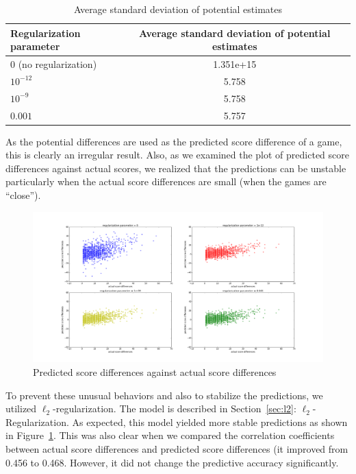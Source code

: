 \documentclass{article} %
\begin{document}
\begin{table}
\begin{center}
  \begin{tabular}{ | l | c | r | }
    \hline
    Regularization parameter & Average standard deviation of potential estimates \\ \hline
    0 (no regularization) & 1.351e+15 \\ \hline
    $10^{-12}$ & 5.758\\ \hline
    $10^{-9}$ & 5.758\\ \hline
    $0.001$ & 5.757\\
    \hline
  \end{tabular}
  \caption{Average standard deviation of potential estimates}
  \label{table:std}
\end{center}
\end{table}

As the potential differences are used as the predicted score difference of a game, this is clearly an irregular result.  Also, as we examined the plot of predicted score differences against actual scores, we realized that the predictions can be unstable particularly when the actual score differences are small (when the games are ``close''). 

\begin{figure}[ht!]
    \centering
    \includegraphics[width=140mm]{actual_vs_predict.png}
    \caption{Predicted score differences against actual score differences}
    \label{actual_vs_predict}
\end{figure}

To prevent these unusual behaviors and also to stabilize the predictions, we utilized $\ell_2$-regularization.  The model is described in Section~\ref{sec:l2}: $\ell_2$-Regularization.  As expected, this model yielded more stable predictions as shown in Figure~\ref{actual_vs_predict}.  This was also clear when we compared the correlation coefficients between actual score differences and predicted score differences (it improved from 0.456 to 0.468.  However, it did not change the predictive accuracy significantly.
\end{document}
